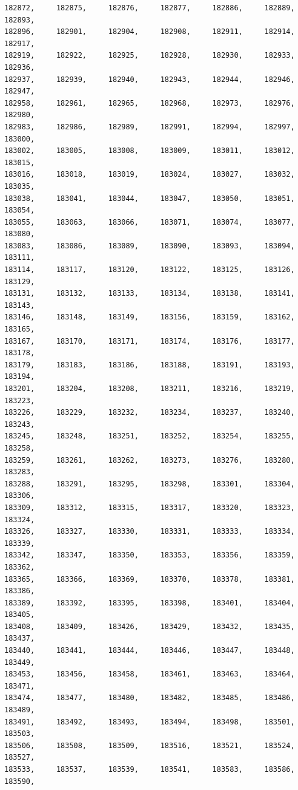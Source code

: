 \documentclass[a4paper,11pt]{report}
\begin{document}
\begin{verbatim}
182872,     182875,     182876,     182877,     182886,     182889,     182893,
182896,     182901,     182904,     182908,     182911,     182914,     182917,
182919,     182922,     182925,     182928,     182930,     182933,     182936,
182937,     182939,     182940,     182943,     182944,     182946,     182947,
182958,     182961,     182965,     182968,     182973,     182976,     182980,
182983,     182986,     182989,     182991,     182994,     182997,     183000,
183002,     183005,     183008,     183009,     183011,     183012,     183015,
183016,     183018,     183019,     183024,     183027,     183032,     183035,
183038,     183041,     183044,     183047,     183050,     183051,     183054,
183055,     183063,     183066,     183071,     183074,     183077,     183080,
183083,     183086,     183089,     183090,     183093,     183094,     183111,
183114,     183117,     183120,     183122,     183125,     183126,     183129,
183131,     183132,     183133,     183134,     183138,     183141,     183143,
183146,     183148,     183149,     183156,     183159,     183162,     183165,
183167,     183170,     183171,     183174,     183176,     183177,     183178,
183179,     183183,     183186,     183188,     183191,     183193,     183194,
183201,     183204,     183208,     183211,     183216,     183219,     183223,
183226,     183229,     183232,     183234,     183237,     183240,     183243,
183245,     183248,     183251,     183252,     183254,     183255,     183258,
183259,     183261,     183262,     183273,     183276,     183280,     183283,
183288,     183291,     183295,     183298,     183301,     183304,     183306,
183309,     183312,     183315,     183317,     183320,     183323,     183324,
183326,     183327,     183330,     183331,     183333,     183334,     183339,
183342,     183347,     183350,     183353,     183356,     183359,     183362,
183365,     183366,     183369,     183370,     183378,     183381,     183386,
183389,     183392,     183395,     183398,     183401,     183404,     183405,
183408,     183409,     183426,     183429,     183432,     183435,     183437,
183440,     183441,     183444,     183446,     183447,     183448,     183449,
183453,     183456,     183458,     183461,     183463,     183464,     183471,
183474,     183477,     183480,     183482,     183485,     183486,     183489,
183491,     183492,     183493,     183494,     183498,     183501,     183503,
183506,     183508,     183509,     183516,     183521,     183524,     183527,
183533,     183537,     183539,     183541,     183583,     183586,     183590,

\end{verbatim}
\end{document}
